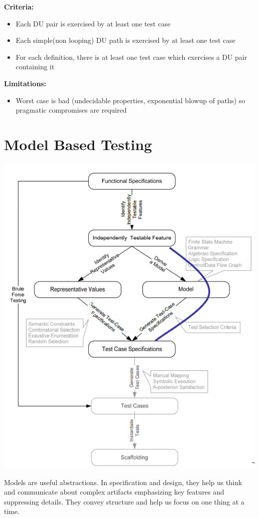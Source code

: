 \documentclass{article}
\begin{document}
\textbf{Criteria:}
\begin{itemize}
  \item  Each DU pair is exercised by at least one test case
  \item   Each simple(non looping) DU path is exercised by at least one test case
  \item  For each definition, there is at least one test case which exercises a DU pair containing it
\end{itemize}

\textbf{Limitations:}
\begin{itemize}
  \item  Worst case is bad (undecidable properties, exponential blowup of paths) so pragmatic compromises are required
\end{itemize}


\section{Model Based Testing}
\includegraphics[scale=1.6]{model_testing}

Models are useful abstractions. In specification and design, they help us think and communicate about complex artifacts emphasizing key features and suppressing details. They convey structure and help us focus on one thing at a time.
\end{document}

